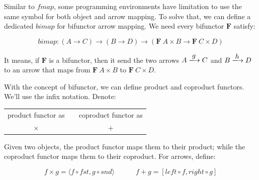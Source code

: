 \documentclass[b5paper]{article}
\begin{document}
Similar to $fmap$, some programming environments have limitation to use the same symbol for both object and arrow mapping. To solve that, we can define a dedicated $bimap$ for bifunctor arrow mapping. We need every bifunctor $\mathbf{F}$ satisfy:

\[
bimap : (A \to C) \to (B \to D) \to (\mathbf{F}\ A \times B \to \mathbf{F}\ C \times D)
\]

It means, if $\mathbf{F}$ is a bifunctor, then it send the two arrows $A \arrowto{g} C$ and $B \arrowto{h} D$ to an arrow that maps from $\mathbf{F}\ A \times B$ to $\mathbf{F}\ C \times D$.

With the concept of bifunctor, we can define product and coproduct functors. We'll use the infix notation. Denote:

\begin{center}
\begin{tabular}{ccc}
 product functor as & \quad \quad \quad & coproduct functor as \\
 $\times$  & \quad \quad \quad & $+$ \\
\end{tabular}
\end{center}

Given two objects, the product functor maps them to their product; while the coproduct functor maps them to their coproduct. For arrows, define:

\[
f \times g = \langle f \circ fst, g \circ snd \rangle
\quad \quad \quad
f + g = [left \circ f, right \circ g]
\]
\end{document}
